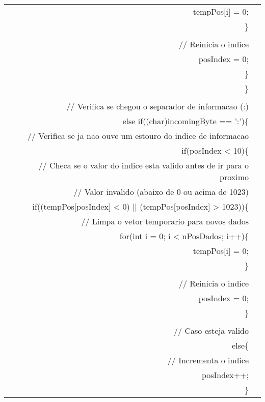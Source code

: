 \begin{longtable}{Rp{15cm}}
\qquad \qquad \qquad \qquad          tempPos[i] = 0; \\
\qquad \qquad \qquad        \} \\
\\
\qquad \qquad \qquad        // Reinicia o indice \\
\qquad \qquad \qquad        posIndex = 0; \\        
\qquad \qquad      \} \\
\qquad    \} \\
\\
\qquad    // Verifica se chegou o separador de informacao (:) \\
\qquad    else if((char)incomingByte == ':')\{ \\
\qquad \qquad      // Verifica se ja nao ouve um estouro do indice de informacao \\
\qquad \qquad      if(posIndex < 10)\{ \\
\qquad \qquad \qquad        // Checa se o valor do indice esta valido antes de ir para o proximo \\
\qquad \qquad \qquad          // Valor invalido (abaixo de 0 ou acima de 1023) \\
\qquad \qquad \qquad         if((tempPos[posIndex] < 0) || (tempPos[posIndex] > 1023))\{ \\
\qquad \qquad \qquad \qquad          // Limpa o vetor temporario para novos dados \\
\qquad \qquad \qquad \qquad          for(int i = 0; i < nPosDados; i++)\{ \\
\qquad \qquad \qquad \qquad \qquad            tempPos[i] = 0; \\
\qquad \qquad \qquad \qquad          \} \\  
\\
\qquad \qquad \qquad \qquad          // Reinicia o indice \\
\qquad \qquad \qquad \qquad          posIndex = 0; \\          
\qquad \qquad \qquad        \} \\
        \\
\qquad \qquad \qquad        // Caso esteja valido \\
\qquad \qquad \qquad        else\{ \\
\qquad \qquad \qquad \qquad            // Incrementa o indice \\
\qquad \qquad \qquad \qquad            posIndex++; \\        
\qquad \qquad \qquad        \} \\

\end{longtable}
